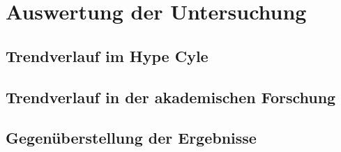 \section{Auswertung der Untersuchung}
\subsection{Trendverlauf im Hype Cyle}
\subsection{Trendverlauf in der akademischen Forschung}
\subsection{Gegenüberstellung der Ergebnisse}